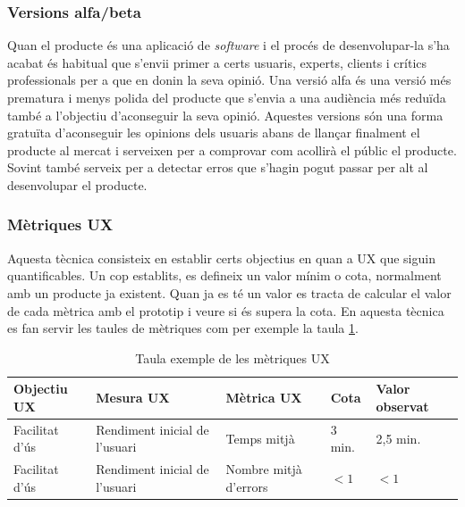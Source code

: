 \subsubsection{Versions alfa/beta}
Quan el producte és una aplicació de \textit{software} i el procés de desenvolupar-la s'ha acabat és habitual que s'envii primer a certs usuaris, experts, clients i crítics professionals per a que en donin la seva opinió. Una versió alfa és una versió més prematura i menys polida del producte que s'envia a una audiència més reduïda també a l'objectiu d'aconseguir la seva opinió. 
Aquestes versions són una forma gratuïta d'aconseguir les opinions dels usuaris abans de llançar finalment el producte al mercat i serveixen per a comprovar com acollirà el públic el producte. Sovint també serveix per a detectar erros que s'hagin pogut passar per alt al desenvolupar el producte. 

\subsubsection{Mètriques \ac{UX}}
Aquesta tècnica consisteix en establir certs objectius en quan a \ac{UX} que siguin quantificables. Un cop establits, es defineix un valor mínim o cota, normalment amb un producte ja existent. Quan ja es té un valor es tracta de calcular el valor de cada mètrica amb el prototip i veure si és supera la cota. En aquesta tècnica es fan servir les taules de mètriques com per exemple la taula \ref{table:UX_metrics}.

\begin{table}
\caption{Taula exemple de les mètriques \ac{UX}}
\label{table:UX_metrics}

\begin{tabular}{ | p{2.4cm} | p{2.7cm} | p{2.6cm} | p{1.6cm} | p{2.6cm} |}
\hline
\textbf{Objectiu \ac{UX}} & \textbf{Mesura \ac{UX}} & \textbf{Mètrica \ac{UX}} & \textbf{Cota} & \textbf{Valor observat} \\
\hline
Facilitat d'ús & Rendiment inicial de l'usuari & Temps mitjà & 3 min. & 2,5 min. \\
\hline
Facilitat d'ús & Rendiment inicial de l'usuari & Nombre mitjà d'errors & $<1$ & $<1$ \\
\hline
\end{tabular}
\end{table}


